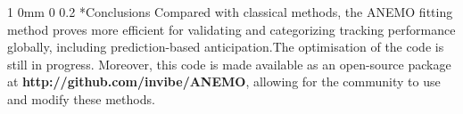 \documentclass[profile,final,english, draft]{sciposter}%
\makeatletter
\renewcommand{\section}{\@startsection
        {section}%
        {1}%
        {0mm}%
        {0\baselineskip}%
        {0.2\baselineskip}%
        {\LARGE\color{red}\bfseries}}%
\makeatother
\begin{document}
\vspace{.5\baselineskip}

\section*{Conclusions}
\vspace{-.7\baselineskip}
Compared with classical methods, the ANEMO fitting method proves more efficient for validating and categorizing tracking performance globally, including prediction-based anticipation.The optimisation of the code is still in progress. Moreover, this code is made available as an open-source package at \textbf{http://github.com/invibe/ANEMO}, allowing for the community to use and modify these methods.
{\tiny
\printbibliography
}


\end{document}
